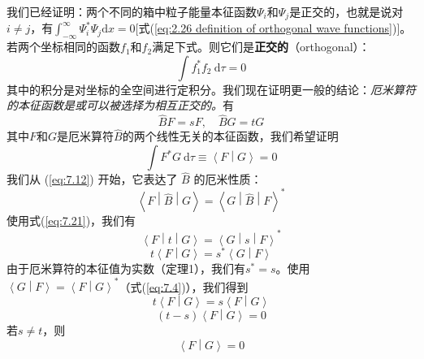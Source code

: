     我们已经证明：两个不同的箱中粒子能量本征函数$\Psi_i$和$\Psi_j$是正交的，也就是说对$i \neq j$，有$\int_{-\infty}^{\infty}\Psi_i^{\ast}\Psi_j \mathrm{d}x = 0$[式(\ref{eq:2.26 definition of orthogonal wave functions})]。若两个坐标相同的函数$f_1$和$f_2$满足下式。则它们是\textbf{正交的}（orthogonal）：
    \begin{equation}
        \boxed{
            \int f_1^{\ast} f_2 \:\mathrm{d}\tau = 0
        }
        \label{eq:7.20}
    \end{equation}
    其中的积分是对坐标的全空间进行定积分。我们现在证明更一般的结论：\textit{厄米算符的本征函数是或可以被选择为相互正交的。}有
    \begin{equation}
        \hat{B}F = sF, \quad \hat{B}G = tG
        \label{eq:7.21}
    \end{equation}
    其中$F$和$G$是厄米算符$\hat{B}$的两个线性无关的本征函数，我们希望证明
    \begin{equation*}
        \int F^{\ast} G \:\mathrm{d}\tau \equiv \left\langle F \middle| G \right\rangle = 0
    \end{equation*}
    我们从 (\ref{eq:7.12}) 开始，它表达了 $\hat{B}$ 的厄米性质：
    \begin{equation*}
        \left\langle F \middle| \hat{B} \middle| G \right\rangle = \left\langle G \middle| \hat{B} \middle| F \right\rangle^{\ast}
    \end{equation*}
    使用式(\ref{eq:7.21})，我们有
    \begin{equation*}
        \left\langle F \middle| t \middle| G \right\rangle = \left\langle G \middle| s \middle| F \right\rangle^{\ast}
    \end{equation*}
    \begin{equation*}
        t \left\langle F \middle| G \right\rangle = s^{\ast} \left\langle G \middle| F \right\rangle
    \end{equation*}
    由于厄米算符的本征值为实数（定理1），我们有$s^{\ast} = s$。使用$\left\langle G \middle| F \right\rangle = \left\langle F \middle| G \right\rangle^{\ast}$（式(\ref{eq:7.4})），我们得到
    \begin{equation*}
        t \left\langle F \middle| G \right\rangle = s \left\langle F \middle| G \right\rangle
    \end{equation*}
    \begin{equation*}
        \left(t - s\right) \left\langle F \middle| G \right\rangle = 0
    \end{equation*}
    若$s \neq t$，则
    \begin{equation}
        \left\langle F \middle| G \right\rangle = 0
        \label{eq:7.22}
    \end{equation}

